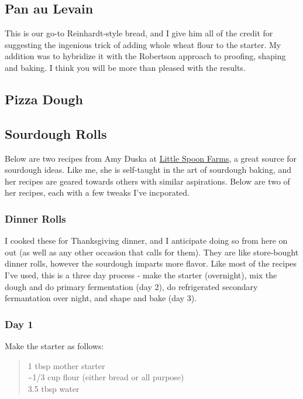 \documentclass[
]{book}
\begin{document}
\hypertarget{pal}{%
\subsection{Pan au Levain}\label{pal}}

This is our go-to Reinhardt-style bread, and I give him all of the credit for suggesting the ingenious trick of adding whole wheat flour to the starter. My addition was to hybridize it with the Robertson approach to proofing, shaping and baking. I think you will be more than pleased with the results.

\hypertarget{pizzadough}{%
\subsection{Pizza Dough}\label{pizzadough}}

\hypertarget{rolls}{%
\subsection{Sourdough Rolls}\label{rolls}}

Below are two recipes from Amy Duska at \href{https://littlespoonfarm.com/}{Little Spoon Farms}, a great source for sourdough ideas. Like me, she is self-taught in the art of sourdough baking, and her recipes are geared towards others with similar aspirations. Below are two of her recipes, each with a few tweaks I've incporated.

\hypertarget{drolls}{%
\subsubsection{Dinner Rolls}\label{drolls}}

I cooked these for Thanksgiving dinner, and I anticipate doing so from here on out (as well as any other occasion that calls for them). They are like store-bought dinner rolls, however the sourdough imparts more flavor. Like most of the recipes I've used, this is a three day process - make the starter (overnight), mix the dough and do primary fermentation (day 2), do refrigerated secondary fermantation over night, and shape and bake (day 3).

\hypertarget{day-1}{%
\subsubsection{Day 1}\label{day-1}}

Make the starter as follows:

\begin{quote}
1 tbsp mother starter\\
\textasciitilde1/3 cup flour (either bread or all purpose)\\
3.5 tbsp water
\end{quote}
\end{document}
